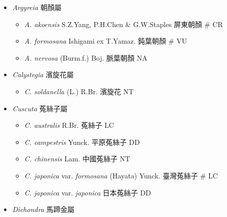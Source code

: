 
  \begin{itemize}
 \item[] \textit{Argyreia} 朝顏屬
                                
  \begin{itemize}
        \item[] \textit{A. akoensis} S.Z.Yang, P.H.Chen \& G.W.Staples  屏東朝顏  \# CR
        \item[] \textit{A. formosana} Ishigami ex T.Yamaz.  鈍葉朝顏  \# VU
        \item[] \textit{A. nervosa} (Burm.f.) Boj.  脈葉朝顏   NA
  \end{itemize}
 \item[] \textit{Calystegia} 濱旋花屬
                                
  \begin{itemize}
        \item[] \textit{C. soldanella} (L.) R.Br.  濱旋花   NT
  \end{itemize}
 \item[] \textit{Cuscuta} 菟絲子屬
                                
  \begin{itemize}
        \item[] \textit{C. australis} R.Br.  菟絲子   LC
        \item[] \textit{C. campestris} Yunck.  平原菟絲子   DD
        \item[] \textit{C. chinensis} Lam.  中國菟絲子   NT
        \item[] \textit{C. japonica} var. \textit{formosana} (Hayata) Yunck.  臺灣菟絲子  \# LC
        \item[] \textit{C. japonica} var. \textit{japonica}   日本菟絲子   DD
  \end{itemize}
 \item[] \textit{Dichondra} 馬蹄金屬
                                

\end{itemize}
